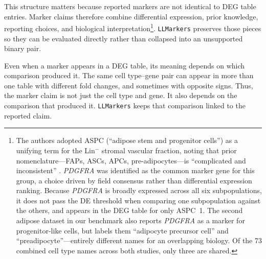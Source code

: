 \documentclass[10pt,twocolumn]{article}
\theoremstyle{plain}
\theoremstyle{definition}
\theoremstyle{remark}
\begin{document}
This structure matters because reported markers are not identical to DEG table entries.  Marker claims therefore combine differential expression, prior knowledge, reporting choices, and biological interpretation\footnote{The authors adopted ASPC (``adipose stem and progenitor cells'') as a unifying term for the Lin$^-$ stromal vascular fraction, noting that prior nomenclature---FAPs, ASCs, APCs, pre-adipocytes---is ``complicated and inconsistent'' \citep{Emont2022}. \textit{PDGFRA} was identified as the common marker gene for this group, a choice driven by field consensus rather than differential expression ranking. Because \textit{PDGFRA} is broadly expressed across all six subpopulations, it does not pass the DE threshold when comparing one subpopulation against the others, and appears in the DEG table for only ASPC~1. The second adipose dataset in our benchmark \citep{Hildreth2021} also reports \textit{PDGFRA} as a marker for progenitor-like cells, but labels them ``adipocyte precursor cell'' and ``preadipocyte''---entirely different names for an overlapping biology. Of the 73 combined cell type names across both studies, only three are shared.}. \texttt{LLMarkers} preserves those pieces so they can be evaluated directly rather than collapsed into an unsupported binary pair.

Even when a marker appears in a DEG table, its meaning depends on which comparison produced it. The same cell type--gene pair can appear in more than one table with different fold changes, and sometimes with opposite signs.  Thus, the marker claim is not just the cell type and gene. It also depends on the comparison that produced it. \texttt{LLMarkers} keeps that comparison linked to the reported claim.
\end{document}
